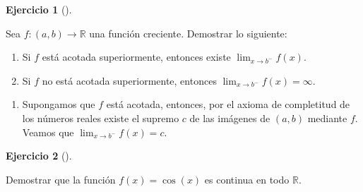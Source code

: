 \documentclass[
  spanish,
  a4paper,
]{scrreport}
\providecommand{\tightlist}{%
  \setlength{\itemsep}{0pt}\setlength{\parskip}{0pt}}
\theoremstyle{definition}
\newtheorem{exercise}{Ejercicio}[chapter]
\theoremstyle{remark}
\begin{document}
\begin{exercise}[]\protect\hypertarget{exr-limites-funciones-acotadas}{}\label{exr-limites-funciones-acotadas}

Sea \(f:(a,b)\to \mathbb{R}\) una función creciente. Demostrar lo
siguiente:

\begin{enumerate}
\def\labelenumi{\alph{enumi}.}
\tightlist
\item
  Si \(f\) está acotada superiormente, entonces existe
  \(\lim_{x\to b^-}f(x)\).
\item
  Si \(f\) no está acotada superiormente, entonces
  \(\lim_{x\to b^-}f(x)=\infty\).
\end{enumerate}

\end{exercise}

\begin{tcolorbox}[enhanced jigsaw, arc=.35mm, bottomrule=.15mm, bottomtitle=1mm, breakable, colback=white, colbacktitle=quarto-callout-tip-color!10!white, colframe=quarto-callout-tip-color-frame, coltitle=black, left=2mm, leftrule=.75mm, opacityback=0, opacitybacktitle=0.6, rightrule=.15mm, title=\textcolor{quarto-callout-tip-color}{\faLightbulb}\hspace{0.5em}{Solución}, titlerule=0mm, toprule=.15mm, toptitle=1mm]

\begin{enumerate}
\def\labelenumi{\alph{enumi}.}
\tightlist
\item
  Supongamos que \(f\) está acotada, entonces, por el axioma de
  completitud de los números reales existe el supremo \(c\) de las
  imágenes de \((a,b)\) mediante \(f\). Veamos que
  \(\lim_{x\to b^-} f(x) = c\).
\end{enumerate}

\end{tcolorbox}

\begin{exercise}[]\protect\hypertarget{exr-continuidad-coseno}{}\label{exr-continuidad-coseno}

Demostrar que la función \(f(x)=\cos(x)\) es continua en todo
\(\mathbb{R}\).

\end{exercise}
\end{document}

